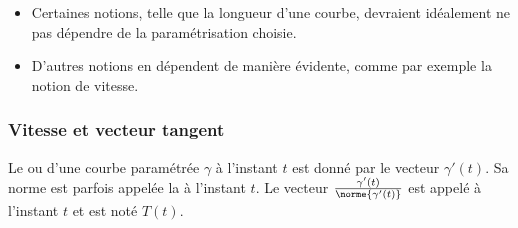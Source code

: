 \begin{frame}
\begin{remark*}
  \begin{itemize}
  \item Certaines notions, telle que la longueur d'une courbe, devraient idéalement ne pas dépendre de la paramétrisation choisie.\pause{}
  \item D'autres notions en dépendent de manière évidente, comme par exemple la notion de vitesse.\pause{}
  \end{itemize}
\end{remark*}
\end{frame}

\subsubsection{Vitesse et vecteur tangent}
\label{sec:vitesse}
\begin{frame}
\begin{definition}
  Le  ou  d'une courbe paramétrée \(\gamma\) à l'instant \(t\) est donné par le vecteur \(\gamma'(t)\).\pause{} Sa norme est parfois appelée la  à l'instant \(t\).\pause{} Le vecteur  \(\frac{\gamma'(t)}{\norme{\gamma'(t)}}\) est appelé  à l'instant \(t\) et est noté \(T(t)\).
\end{definition}
\end{frame}
